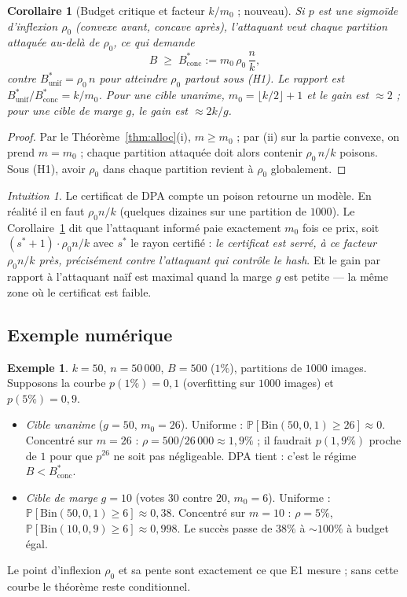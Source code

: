 \documentclass[11pt,a4paper]{article}
\theoremstyle{plain}
\newtheorem{corollary}[theorem]{Corollaire}
\theoremstyle{definition}
\newtheorem{example}[theorem]{Exemple}
\theoremstyle{remark}
\newtheorem{intuition}[theorem]{Intuition}
\newcommand{\Prob}{\mathbb{P}}
\newcommand{\Bin}{\mathrm{Bin}}
\begin{document}
\begin{corollary}[Budget critique et facteur $k/m_0$ ; nouveau]\label{cor:budget}
Si $p$ est une sigmoïde d'inflexion $\rho_0$ (convexe avant, concave après), l'attaquant veut
chaque partition attaquée au-delà de $\rho_0$, ce qui demande
\[
B\;\ge\;B^*_{\mathrm{conc}}:=m_0\,\rho_0\,\frac nk ,
\]
contre $B^*_{\mathrm{unif}}=\rho_0\,n$ pour atteindre $\rho_0$ partout sous (H1). Le rapport est
$B^*_{\mathrm{unif}}/B^*_{\mathrm{conc}}=k/m_0$. Pour une cible unanime, $m_0=\lfloor k/2\rfloor+1$
et le gain est $\approx2$ ; pour une cible de marge $g$, le gain est $\approx2k/g$.
\end{corollary}
\begin{proof}
Par le Théorème~\ref{thm:alloc}(i), $m\ge m_0$ ; par (ii) sur la partie convexe, on prend
$m=m_0$ ; chaque partition attaquée doit alors contenir $\rho_0\,n/k$ poisons. Sous (H1), avoir
$\rho_0$ dans chaque partition revient à $\rho_0$ globalement.
\end{proof}

\begin{intuition}
Le certificat de DPA compte \og{}un poison retourne un modèle\fg{}. En réalité il en faut
$\rho_0n/k$ (quelques dizaines sur une partition de $1000$). Le Corollaire~\ref{cor:budget} dit
que l'attaquant informé paie exactement $m_0$ fois ce prix, soit $(s^*+1)\cdot\rho_0n/k$ avec
$s^*$ le rayon certifié : \emph{le certificat est serré, à ce facteur $\rho_0n/k$ près, précisément
contre l'attaquant qui contrôle le hash}. Et le gain par rapport à l'attaquant naïf est maximal
quand la marge $g$ est petite --- la même zone où le certificat est faible.
\end{intuition}

\subsection{Exemple numérique}

\begin{example}
$k=50$, $n=50\,000$, $B=500$ ($1\%$), partitions de $1000$ images. Supposons la courbe
$p(1\%)=0{,}1$ (overfitting sur $1000$ images) et $p(5\%)=0{,}9$.
\begin{itemize}[nosep]
\item \emph{Cible unanime} ($g=50$, $m_0=26$). Uniforme : $\Prob[\Bin(50,0{,}1)\ge26]\approx0$.
Concentré sur $m=26$ : $\rho=500/26\,000\approx1{,}9\%$ ; il faudrait $p(1{,}9\%)$ proche de $1$
pour que $p^{26}$ ne soit pas négligeable. DPA tient : c'est le régime $B<B^*_{\mathrm{conc}}$.
\item \emph{Cible de marge} $g=10$ (votes $30$ contre $20$, $m_0=6$). Uniforme :
$\Prob[\Bin(50,0{,}1)\ge6]\approx0{,}38$. Concentré sur $m=10$ : $\rho=5\%$,
$\Prob[\Bin(10,0{,}9)\ge6]\approx0{,}998$. Le succès passe de $38\%$ à $\sim100\%$ à budget égal.
\end{itemize}
Le point d'inflexion $\rho_0$ et sa pente sont exactement ce que E1 mesure ; sans cette courbe
le théorème reste conditionnel.
\end{example}
\end{document}
